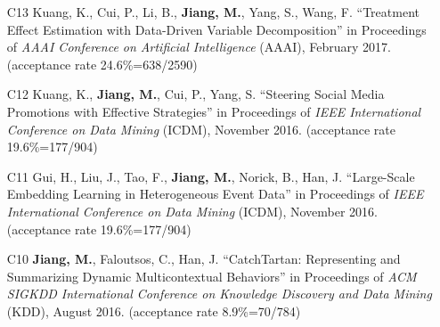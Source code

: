 \documentclass[10pt]{article}
\newenvironment{myindentpar}[1]%
{\begin{list}{}%
         {\setlength{\leftmargin}{#1}}%
         \item[]%
}
{\end{list}}
\newcounter{list}
\newcommand{\hide}[1]{}
\begin{document}
\begin{myindentpar}{0.00cm}
\begin{enumerate}[leftmargin=.5cm]
	\hide{\vspace{-0.1cm}\hspace{0.5cm}{\small \emph{Mr. Ren conceived the idea. Mr. Shen implemented the system and completed the experiments. Mr. Ren wrote the paper. I edited the paper.}}}

\item[C13] Kuang, K., Cui, P., Li, B., \textbf{Jiang, M.}, Yang, S., Wang, F. ``Treatment Effect Estimation with Data-Driven Variable Decomposition'' in Proceedings of \emph{AAAI Conference on Artificial Intelligence} (AAAI), February 2017. (acceptance rate 24.6\%=638/2590)

	\hide{\vspace{-0.1cm}\hspace{0.5cm}{\small \emph{Mr. Kuang conceived the idea in consultation with myself. Mr. Kuang implemented the system and completed the experiments. Mr. Kuang wrote the paper.}}}

\item[C12] Kuang, K., \textbf{Jiang, M.}, Cui, P., Yang, S. ``Steering Social Media Promotions with Effective Strategies'' in Proceedings of \emph{IEEE International Conference on Data Mining} (ICDM), November 2016. (acceptance rate 19.6\%=177/904)

	\hide{\vspace{-0.1cm}\hspace{0.5cm}{\small \emph{I conceived the idea. Mr. Kuang implemented the system and completed the experiments. Mr. Kuang and I wrote the paper.}}}

\item[C11] Gui, H., Liu, J., Tao, F., \textbf{Jiang, M.}, Norick, B., Han, J. ``Large-Scale Embedding Learning in Heterogeneous Event Data'' in Proceedings of \emph{IEEE International Conference on Data Mining} (ICDM), November 2016. (acceptance rate 19.6\%=177/904)

	\hide{\vspace{-0.1cm}\hspace{0.5cm}{\small \emph{Ms. Gui conceived the idea in consultation with myself. Ms. Gui, her colleague Dr. Liu, and I implemented the system and completed the experiments. Ms. Gui wrote the paper. I edited the paper.}}}

\item[C10] \textbf{Jiang, M.}, Faloutsos, C., Han, J. ``CatchTartan: Representing and Summarizing Dynamic Multicontextual Behaviors'' in Proceedings of \emph{ACM SIGKDD International Conference on Knowledge Discovery and Data Mining} (KDD), August 2016. (acceptance rate 8.9\%=70/784)


\end{enumerate}
\end{myindentpar}
\end{document}
